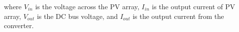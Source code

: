 \noindent where $ V_{in} $ is the voltage across the PV array, $ I_{in} $ is the output current of PV array, $ V_{out} $ is the  DC bus voltage, and $ I_{out} $ is the output current from the converter.

% 
%
%
%
% 
%  
% 
 
